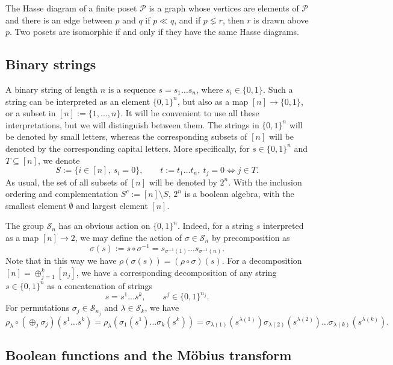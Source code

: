\documentclass[12pt]{article}
\theoremstyle{definition}
\theoremstyle{remark}
\def\cover{\ll}
\def\Pe{\mathcal P}
\def\permut{\mathscr{S}}
\begin{document}
The Hasse diagram of a finite poset $\Pe$ is a graph whose vertices are elements of $\Pe$
and there is an edge between $p$ and $q$ if $p\cover q$, and if $p\lneq r$, then $r$ is drawn above
$p$. Two posets are isomorphic if and only if they have the same Hasse diagrams. 


\subsection{Binary strings}

A binary string of length $n$ is a sequence  $s=s_1\dots s_n$, where $s_i\in
\{0,1\}$. Such a string can be interpreted as an element $\{0,1\}^n$, but also as a 
map $[n]\to \{0,1\}$, or a subset in  $[n]:=\{1,\dots,n\}$. It will be convenient to use
all these interpretations, but we will distinguish between them. The strings in
$\{0,1\}^n$ will be denoted by small letters, whereas the corresponding subsets of $[n]$
will be denoted by the corresponding capital letters. More specifically, for $s\in \{0,1\}^n$ and 
$T\subseteq [n]$, we denote
\begin{equation}\label{eq:string_subset}
S:=\{i\in [n],\ s_i=0\},\qquad t:=t_1\dots t_n,\ t_j=0 \iff j\in T.
\end{equation}
As usual, the set of all subsets of $[n]$ will be denoted by $2^n$. 
With the inclusion ordering and complementation $S^c:=[n]\setminus S$,
$2^n$ is a boolean algebra, with the smallest element $\emptyset$ and largest element
$[n]$.  

The group $\permut_n$ has an obvious action on $\{0,1\}^n$. Indeed,
 for a string $s$  interpreted as a map $[n]\to 2$, we may define the action of
$\sigma\in \permut_n$ by precomposition as
\[
\sigma(s):=s\circ\sigma^{-1}=s_{\sigma^{-1}(1)}\dots s_{\sigma^{-1}(n)}.
\]
Note that in this way we have $\rho(\sigma(s))=(\rho\circ \sigma)(s)$. For a decomposition
$[n]=\oplus_{j=1}^k[n_j]$, we have a corresponding decomposition of
any string $s\in \{0,1\}^n$ as a concatenation of strings
\[
s=s^1\dots s^k,\qquad s^j\in \{0,1\}^{n_j}.
\]
For permutations $\sigma_j\in \permut_{n_j}$ and  $\lambda\in
\permut_k$, we have
\[
\rho_\lambda\circ(\oplus_j\sigma_j)(s^1\dots s^k)=\rho_\lambda(\sigma_1(s^1)\dots
\sigma_k(s^k))=\sigma_{\lambda(1)}(s^{\lambda(1)})\sigma_{\lambda(2)}(s^{\lambda(2)})\dots
\sigma_{\lambda(k)}(s^{\lambda(k)}).
\]





\subsection{Boolean functions and the  M\"obius transform}
\label{sec:boolean}
\end{document}

